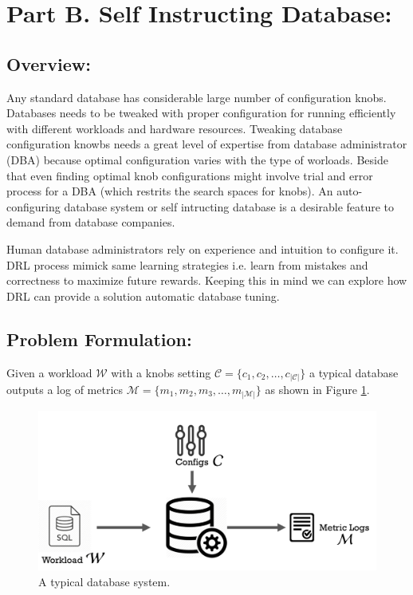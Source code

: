 \section{Part B.  Self Instructing Database:}
\label{part_b}
\subsection{Overview:}
Any standard database has considerable large number of configuration knobs. Databases needs to be tweaked with proper configuration for running efficiently with different workloads and hardware resources. Tweaking database configuration knowbs needs a great level of expertise from database administrator (DBA) because optimal configuration varies with the type of worloads. Beside that even finding optimal knob configurations might involve trial and error process for a DBA (which restrits the search spaces for knobs). An auto-configuring database system or self intructing database is a desirable feature to demand from database companies.


Human database administrators rely on experience and intuition to configure it. DRL process mimick same learning strategies i.e. learn from mistakes and correctness to maximize future rewards. Keeping this in mind we can explore how DRL can provide a solution automatic database tuning.


\subsection{Problem Formulation:}
Given a workload $\mathcal{W}$ with a knobs setting $\mathcal{C} = \{c_1,c_2,\ldots,c_{|\mathcal{C}|}\}$ a typical database outputs a log of metrics $\mathcal{M} = \{m_1,m_2,m_3,\ldots,m_{|\mathcal{M}|}\}$ as shown in Figure \ref{fig:database_01}.

\begin{figure}[h]
	\includegraphics[width=0.9\linewidth ]{fig/database_01.png}
    \vspace{-2mm}
    \caption{A typical database system.}
    \label{fig:database_01}
\end{figure}

